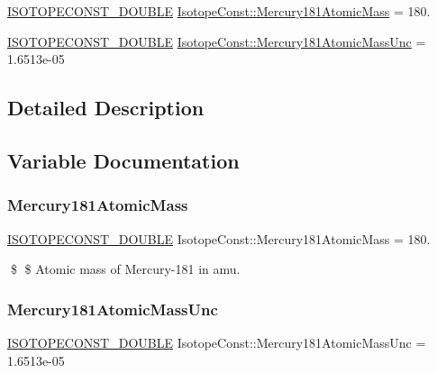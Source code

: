 \begin{DoxyCompactItemize}
\item 
\mbox{\hyperlink{group___isotope_const-_macros_ga8f45a7272ce02c0b4c65c44636ed719a}{I\+S\+O\+T\+O\+P\+E\+C\+O\+N\+S\+T\+\_\+\+D\+O\+U\+B\+LE}} \mbox{\hyperlink{group___isotope_const-_mercury-_hg181_ga94b41b01888aa308078850dec65239b5}{Isotope\+Const\+::\+Mercury181\+Atomic\+Mass}} = 180.
\item 
\mbox{\hyperlink{group___isotope_const-_macros_ga8f45a7272ce02c0b4c65c44636ed719a}{I\+S\+O\+T\+O\+P\+E\+C\+O\+N\+S\+T\+\_\+\+D\+O\+U\+B\+LE}} \mbox{\hyperlink{group___isotope_const-_mercury-_hg181_ga8b2330837626a729a6fee5b8b8eeddf6}{Isotope\+Const\+::\+Mercury181\+Atomic\+Mass\+Unc}} = 1.\+6513e-\/05
\end{DoxyCompactItemize}


\subsection{Detailed Description}


\subsection{Variable Documentation}
\mbox{\label{group___isotope_const-_mercury-_hg181_ga94b41b01888aa308078850dec65239b5}} 
\subsubsection{\texorpdfstring{Mercury181\+Atomic\+Mass}{Mercury181AtomicMass}}
{\footnotesize\ttfamily \mbox{\hyperlink{group___isotope_const-_macros_ga8f45a7272ce02c0b4c65c44636ed719a}{I\+S\+O\+T\+O\+P\+E\+C\+O\+N\+S\+T\+\_\+\+D\+O\+U\+B\+LE}} Isotope\+Const\+::\+Mercury181\+Atomic\+Mass = 180.}

\$ \$ Atomic mass of Mercury-\/181 in amu. \mbox{\label{group___isotope_const-_mercury-_hg181_ga8b2330837626a729a6fee5b8b8eeddf6}} 
\subsubsection{\texorpdfstring{Mercury181\+Atomic\+Mass\+Unc}{Mercury181AtomicMassUnc}}
{\footnotesize\ttfamily \mbox{\hyperlink{group___isotope_const-_macros_ga8f45a7272ce02c0b4c65c44636ed719a}{I\+S\+O\+T\+O\+P\+E\+C\+O\+N\+S\+T\+\_\+\+D\+O\+U\+B\+LE}} Isotope\+Const\+::\+Mercury181\+Atomic\+Mass\+Unc = 1.\+6513e-\/05}

